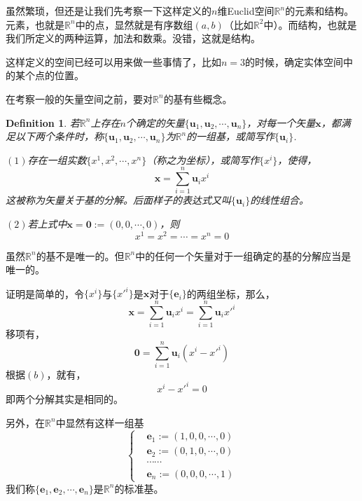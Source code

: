 \documentclass[11pt,a4paper,openany]{book}%
\theoremstyle{plain}%
\newtheorem{defi}{Definition}[chapter]%
\newcommand{\NO}[1]{{$(#1)$}}%
\begin{document}
虽然繁琐，但还是让我们先考察一下这样定义的$n$维Euclid空间$\mathbb{R}^{n}$的元素和结构。元素，也就是$\mathbb{R}^{n}$中的点，显然就是有序数组$(a,b)$（比如$\mathbb{R}^{2}$中）。而结构，也就是我们所定义的两种运算，加法和数乘。没错，这就是结构。

这样定义的空间已经可以用来做一些事情了，比如$n=3$的时候，确定实体空间中的某个点的位置。

在考察一般的矢量空间之前，要对$\mathbb{R}^{n}$的基有些概念。
\begin{defi}
\label{1}
若$\mathbb{R}^{n}$上存在$n$个确定的矢量$\{\bm{u}_{1},\bm{u}_{2},\cdots,\bm{u}_{n}\}$，对每一个矢量$\bm{x}$，都满足以下两个条件时，称$\{\bm{u}_{1},\bm{u}_{2},\cdots,\bm{u}_{n}\}$为$\mathbb{R}^{n}$的一组基，或简写作$\{\bm{u}_{i}\}$.

\NO{1}存在一组实数$\{x^{1},x^{2},\cdots,x^{n}\}$（称之为{\kaishu 坐标}），或简写作$\{x^{i}\}$，使得，
\[
\bm{x}=\sum_{i=1}^{n}\bm{u}_{i}x^{i}
\]
这被称为矢量关于基的分解。后面样子的表达式又叫$\{\bm{u}_{i}\}$的线性组合。

\NO{2}若上式中$\bm{x}=\bm{0}:=(0,0,\cdots,0)$，则
\[
x^{1}=x^{2}=\cdots=x^{n}=0
\]
\end{defi}

\indent 虽然$\mathbb{R}^{n}$的基不是唯一的。但$\mathbb{R}^{n}$中的任何一个矢量对于一组确定的基的分解应当是唯一的。

证明是简单的，令$\{x^{i}\}$与$\{x'^{i}\}$是$\bm{x}$对于$\{\bm{e}_{i}\}$的两组坐标，那么，
\[
\bm{x}=\sum_{i=1}^{n}\bm{u}_{i}x^{i}=\sum_{i=1}^{n}\bm{u}_{i}x'^{i}
\]
移项有，
\[
\bm{0}=\sum_{i=1}^{n}\bm{u}_{i}(x^{i}-x'^{i})
\]
根据$(b)$，就有，
\[x^{i}-x'^{i}=0\]
即两个分解其实是相同的。

另外，在$\mathbb{R}^{n}$中显然有这样一组基
\begin{equation*}
\left\{
\begin{split}
&\bm{e}_{1}:=(1,0,0,\cdots,0)\\
&\bm{e}_{2}:=(0,1,0,\cdots,0)\\
&\cdots \cdots \\
&\bm{e}_{n}:=(0,0,0,\cdots,1)
\end{split}
\right.
\end{equation*}
我们称$\{\bm{e}_{1},\bm{e}_{2},\cdots,\bm{e}_{n}\}$是$\mathbb{R}^{n}$的标准基。
\end{document}
